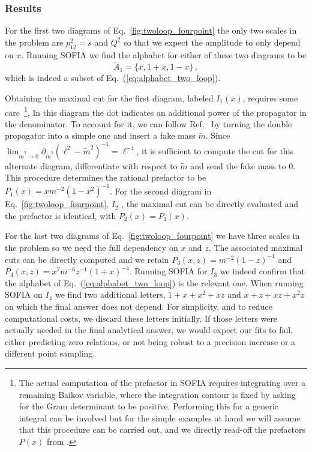 \documentclass[a4paper,11pt]{article}
\begin{document}
\subsubsection{Results}
 For the first two diagrams of Eq.~\eqref{fig:twoloop_fourpoint} the only two scales in the problem are $p_{12}^2=s$ and $Q^2$ so that we expect the amplitude to only depend on $x$. Running \textsc{SOFIA} we find the alphabet for either of these two diagrams to be
\begin{equation}\label{eq:alphabet_two_loop_red}
    \tilde{A}_1 = \{ x, 1+x, 1-x\}\,,
\end{equation}
which is indeed a subset of Eq.~(\ref{eq:alphabet_two_loop}). 

Obtaining the maximal cut for the first diagram, labeled $I_1(x)$, requires some care~\footnote{The actual computation of the prefactor in \textsc{SOFIA} requires integrating over a remaining Baikov variable, where the integration contour is fixed by asking for the Gram determinant to be positive. Performing this for a generic integral can be involved but for the simple examples at hand we will assume that this procedure can be carried out, and we directly read-off the prefactors $P(x)$ from \cite{Gehrmann:2013cxs}.}. In this diagram the dot indicates an additional power of the propagator in the denominator. To account for it, we can follow Ref.~\cite{Primo:2016ebd} by turning the double propagator into a simple one and insert a fake mass $\tilde{m}$. Since $\lim_{\tilde{m}^2\rightarrow 0} \partial_{\tilde{m}^2} (\ell^2-\tilde{m}^2)^{-1} = \ell^{-4}$, it is sufficient to compute the cut for this alternate diagram, differentiate with respect to $\tilde{m}$ and send the fake mass to 0. This procedure determines the rational prefactor to be $P_1(x) = x  m^{-2} (1-x^2)^{-1}$. For the second diagram in Eq.~\eqref{fig:twoloop_fourpoint},  $I_2$ , the maximal cut can be directly evaluated and the prefactor is identical, with $P_2(x)=P_1(x)$. 

For the last two diagrams of Eq.~\eqref{fig:twoloop_fourpoint} we have three scales in the problem so we need the full dependency on $x$ and $z$. The associated maximal cuts can be directly computed and we retain $P_3(x,z)= m^{-2} (1-z)^{-1}$ and $P_4(x,z)=x^2 m^{-6} z^{-1} (1+x)^{-4}$. Running \textsc{SOFIA} for $I_3$ we indeed confirm that the alphabet of Eq.~(\ref{eq:alphabet_two_loop}) is the relevant one. When running \textsc{SOFIA} on $I_4$ we find two additional letters, $1+x+x^2+xz$  and $x+z+xz+x^2z$ on which the final answer does not depend. For simplicity, and to reduce computational costs, we discard these letters initially. If those letters were actually needed in the final analytical answer, we would expect our fits to fail, either predicting zero relations, or not being robust to a precision increase or a different point sampling.
\end{document}

